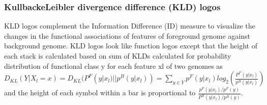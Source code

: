 \documentclass[
12pt, %
a4paper, %
oneside, %
headinclude,footinclude, %
BCOR5mm, %
]{scrartcl}
\begin{document}
\subsubsection*{\textbf{KullbackeLeibler divergence difference (KLD) logos}}
KLD logos \cite{FREYHULT20071276} complement the Information Difference (ID) measure to visualize the changes in the functional associations of features of foreground genome against background genome. KLD logos look like function logos except that the height of each stack is calculated based on sum of KLDs calculated for probability distribution of functional class y for each feature xl of two genomes as $D_{KL}(Y|X_l=x)=D_{KL}(P^F(y|x_l)||p^B(y|x_l))= \sum_{y \in Y} p^F(y|x_l)log_2(\frac{P^F(y|x_l)}{p^B(y|x_l)})$ and the height of each symbol within a bar is proportional to $\frac{p^F(y|x_l)/p^F(y)}{P^B(y|x_l)/p^B(y)}$. %
\end{document}
